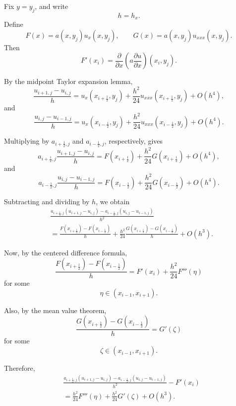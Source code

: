 \documentclass{ctexart}
\begin{document}
\begin{solution}
  Fix \(y=y_j\), and write
  \[
    h=h_x.
  \]
  Define
  \[
    F(x)=a(x,y_j)u_x(x,y_j),
    \qquad
    G(x)=a(x,y_j)u_{xxx}(x,y_j).
  \]
  Then
  \[
    F'(x_i)
    =
    \frac{\partial}{\partial x}
    \left(
      a\frac{\partial u}{\partial x}
    \right)(x_i,y_j).
  \]

  By the midpoint Taylor expansion lemma,
  \[
    \frac{u_{i+1,j}-u_{i,j}}{h}
    =
    u_x(x_{i+\frac12},y_j)
    +
    \frac{h^2}{24}u_{xxx}(x_{i+\frac12},y_j)
    +
    O(h^4),
  \]
  and
  \[
    \frac{u_{i,j}-u_{i-1,j}}{h}
    =
    u_x(x_{i-\frac12},y_j)
    +
    \frac{h^2}{24}u_{xxx}(x_{i-\frac12},y_j)
    +
    O(h^4).
  \]

  Multiplying by \(a_{i+\frac12,j}\) and \(a_{i-\frac12,j}\), respectively, gives
  \[
    a_{i+\frac12,j}
    \frac{u_{i+1,j}-u_{i,j}}{h}
    =
    F(x_{i+\frac12})
    +
    \frac{h^2}{24}G(x_{i+\frac12})
    +
    O(h^4),
  \]
  and
  \[
    a_{i-\frac12,j}
    \frac{u_{i,j}-u_{i-1,j}}{h}
    =
    F(x_{i-\frac12})
    +
    \frac{h^2}{24}G(x_{i-\frac12})
    +
    O(h^4).
  \]

  Subtracting and dividing by \(h\), we obtain
  \[
    \begin{aligned}
      &
      \frac{
        a_{i+\frac12,j}(u_{i+1,j}-u_{i,j})
        -
        a_{i-\frac12,j}(u_{i,j}-u_{i-1,j})
      }{h^2}
      \\
      &=
      \frac{
        F(x_{i+\frac12})-F(x_{i-\frac12})
      }{h}
      +
      \frac{h^2}{24}
      \frac{
        G(x_{i+\frac12})-G(x_{i-\frac12})
      }{h}
      +
      O(h^3).
    \end{aligned}
  \]

  Now, by the centered difference formula,
  \[
    \frac{
      F(x_{i+\frac12})-F(x_{i-\frac12})
    }{h}
    =
    F'(x_i)
    +
    \frac{h^2}{24}F'''(\eta)
  \]
  for some
  \[
    \eta\in(x_{i-1},x_{i+1}).
  \]

  Also, by the mean value theorem,
  \[
    \frac{
      G(x_{i+\frac12})-G(x_{i-\frac12})
    }{h}
    =
    G'(\zeta)
  \]
  for some
  \[
    \zeta\in(x_{i-1},x_{i+1}).
  \]

  Therefore,
  \[
    \begin{aligned}
      &
      \frac{
        a_{i+\frac12,j}(u_{i+1,j}-u_{i,j})
        -
        a_{i-\frac12,j}(u_{i,j}-u_{i-1,j})
      }{h^2}
      -
      F'(x_i)
      \\
      &=
      \frac{h^2}{24}F'''(\eta)
      +
      \frac{h^2}{24}G'(\zeta)
      +
      O(h^3).
    \end{aligned}
  \]


\end{solution}
\end{document}
